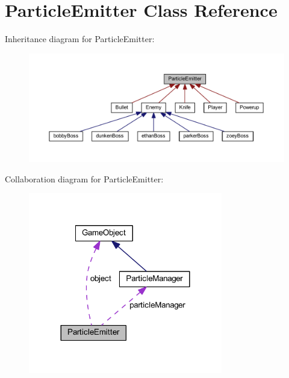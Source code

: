 \hypertarget{class_particle_emitter}{\section{Particle\+Emitter Class Reference}
\label{class_particle_emitter}
}


Inheritance diagram for Particle\+Emitter\+:\nopagebreak
\begin{figure}[H]
\begin{center}
\leavevmode
\includegraphics[width=350pt]{class_particle_emitter__inherit__graph}
\end{center}
\end{figure}


Collaboration diagram for Particle\+Emitter\+:\nopagebreak
\begin{figure}[H]
\begin{center}
\leavevmode
\includegraphics[width=240pt]{class_particle_emitter__coll__graph}
\end{center}
\end{figure}
